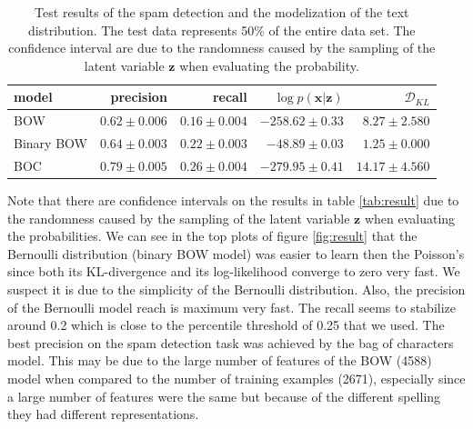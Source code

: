 \documentclass[10pt]{article}
\newcommand{\kldiv}{\mathcal{D}_{KL}}
\begin{document}
\begin{table}[h]
	\caption{Test results of the spam detection and the modelization of the text distribution. The test data represents 50\% of the entire data set. The confidence interval are due to the randomness caused by the sampling of the latent variable $\mathbf{z}$ when evaluating the probability.}
	\centering
	\begin{tabular}{lrrrr}
		\toprule
		model & precision & recall & $\log p(\mathbf{x}|\mathbf{z})$ & $\kldiv$\\
		\midrule
		BOW & $0.62\pm 0.006$ & $0.16\pm 0.004$ & $-258.62\pm 0.33$ & $8.27\pm 2.580$\\
		Binary BOW & $0.64\pm 0.003$ & $0.22\pm 0.003$ & $-48.89\pm 0.03$ & $1.25\pm 0.000$\\
		BOC & $0.79\pm0.005$ & $0.26\pm 0.004$ & $-279.95\pm 0.41$ & $14.17\pm 4.560$ \\
		\bottomrule
	\end{tabular}
	\label{table:result}
\end{table}
Note that there are confidence intervals on the results in table \ref{tab:result} due to the randomness caused by the sampling of the latent variable $\mathbf{z}$ when evaluating the probabilities. We can see in the top plots of figure \ref{fig:result} that the Bernoulli distribution (binary BOW model) was easier to learn then the Poisson's since both its KL-divergence and its log-likelihood converge to zero very fast. We suspect it is due to the simplicity of the Bernoulli distribution. Also, the precision of the Bernoulli model reach is maximum very fast. The recall seems to stabilize around 0.2 which is close to the percentile threshold of 0.25 that we used. The best precision on the spam detection task was achieved by the bag of characters model. This may be due to the large number of features of the BOW (4588) model when compared to the number of training examples (2671), especially since a large number of features were the same but because of the different spelling they had different representations.
\end{document}

